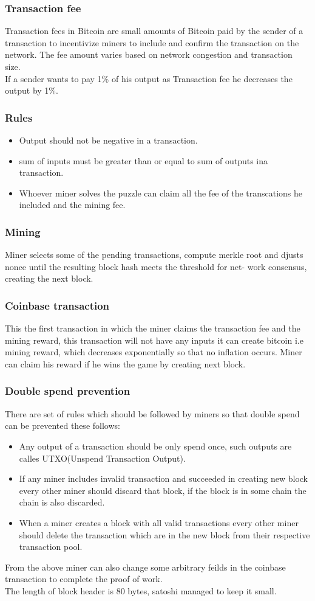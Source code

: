 \documentclass{article}
\begin{document}
\subsubsection{Transaction fee}
Transaction fees in Bitcoin are small amounts of Bitcoin paid by the sender of a transaction to incentivize miners to include and confirm the transaction on the network. The fee amount varies based on network congestion and transaction size. \\
If a sender wants to pay 1\% of his output as Transaction fee he decreases the output by 1\%. 
\subsubsection{Rules}
\begin{itemize}
    \item Output should not be negative in a transaction.
    \item sum of inputs must be greater than or equal to sum of outputs ina transaction.
    \item Whoever miner solves the puzzle can claim all the fee of the transcations he included and the mining fee.  
\end{itemize}
\subsubsection{Mining}
Miner selects some of the pending transactions, compute merkle root and djusts nonce until the resulting block hash meets the threshold for net-
work consensus, creating the next block.
\subsubsection{Coinbase transaction}
This the first transaction in which the miner claims the transaction fee and the mining reward, this transaction will not have any inputs it can create bitcoin i.e mining reward, which decreases exponentially so that no inflation occurs. Miner can claim his reward if he wins the game by creating next block.
\subsubsection{Double spend prevention}
There are set of rules which should be followed by miners so that double spend can be prevented these follows:
\begin{itemize}
    \item Any output of a transaction should be only spend once, such outputs are calles UTXO(Unspend Transaction Output).
    \item If any miner includes invalid transaction and succeeded in creating new block every other miner should discard that block, if the block is in some chain the chain is also discarded.
    \item When a miner creates a block with all valid transactions every other miner should delete the transaction which are in the new block from their respective transaction pool.
\end{itemize}
From the above miner can also change some arbitrary feilds in the coinbase transaction to complete the proof of work. \\
The length of block header is 80 bytes, satoshi managed to keep it small.
\end{document}
